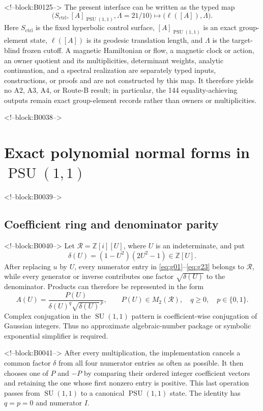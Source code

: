 \documentclass[11pt,a4paper]{article}
\theoremstyle{definition}
\newcommand{\Z}{\mathbb Z}
\newcommand{\PSU}{\operatorname{PSU}}
\newcommand{\SU}{\operatorname{SU}}
\newcommand{\length}{\ell}
\begin{document}
<!--block:B0125-->
The present interface can be written as the typed map
\[
 \bigl(S_{\mathrm{ctrl}},[A]_{\PSU(1,1)},\Lambda=21/10\bigr)
 \longmapsto
 \bigl(\length([A]),\Lambda\bigr).
\]
Here \(S_{\mathrm{ctrl}}\) is the fixed hyperbolic control surface,
\([A]_{\PSU(1,1)}\) is an exact group-element state, \(\length([A])\) is its
geodesic translation length, and \(\Lambda\) is the target-blind frozen
cutoff.  A magnetic Hamiltonian or flow, a magnetic clock or action, an owner
quotient and its multiplicities, determinant weights, analytic continuation,
and a spectral realization are separately typed inputs, constructions, or
proofs and are not constructed by this map.  It therefore yields no A2, A3,
A4, or Route-B result; in particular, the 144 equality-achieving outputs
remain exact group-element records rather than owners or multiplicities.

<!--block:B0038-->
\section{Exact polynomial normal forms in \texorpdfstring{\(\PSU(1,1)\)}{PSU(1,1)}}
\label{sec:normal-form}

<!--block:B0039-->
\subsection{Coefficient ring and denominator parity}

<!--block:B0040-->
Let \(\mathcal R=\Z[i][U]\), where \(U\) is an indeterminate, and put
\[
 \delta(U)=(1-U^2)(2U^2-1)\in\Z[U].
\]
After replacing \(u\) by \(U\), every numerator entry in
\eqref{eq:g01}--\eqref{eq:g23} belongs to \(\mathcal R\), while every generator
or inverse contributes one factor \(\sqrt{\delta(U)}\) to the denominator.
Products can therefore be represented in the form
\begin{equation}\label{eq:state-form}
 A(U)=\frac{P(U)}{\delta(U)^q\sqrt{\delta(U)}^{\,p}},
 \qquad P(U)\in M_2(\mathcal R),\quad q\geq0,\quad p\in\{0,1\}.
\end{equation}
Complex conjugation in the \(\SU(1,1)\) pattern is coefficient-wise
conjugation of Gaussian integers.  Thus no approximate algebraic-number
package or symbolic exponential simplifier is required.

<!--block:B0041-->
After every multiplication, the implementation cancels a common factor
\(\delta\) from all four numerator entries as often as possible.  It then
chooses one of \(P\) and \(-P\) by comparing their ordered integer coefficient
vectors and retaining the one whose first nonzero entry is positive.  This
last operation passes from \(\SU(1,1)\) to a canonical \(\PSU(1,1)\) state.
The identity has \(q=p=0\) and numerator \(I\).
\end{document}

